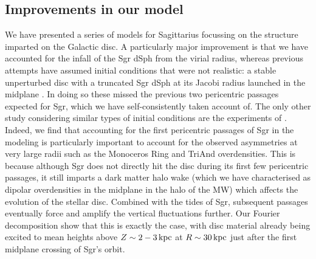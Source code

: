 \documentclass[useAMS,usenatbib]{mnras}
\begin{document}
{\subsection{Improvements in our model}
We have presented a series of models for Sagittarius focussing on the structure imparted on the Galactic disc. A particularly major improvement is that we have accounted for the infall of the Sgr dSph from the virial radius, whereas previous attempts have assumed initial conditions that were not realistic: a stable unperturbed disc with a truncated Sgr dSph at its Jacobi radius launched in the midplane \citep{purcell11,gomez13,price-whelan15}. In doing so these missed the previous two pericentric passages expected for Sgr, which we have self-consistently taken account of. The only other study considering similar types of initial conditions are the experiments of \citep{dierickx17}. Indeed, we find that accounting for the first pericentric passages of Sgr in the modeling is particularly important to account for the observed asymmetries at very large radii such as the Monoceros Ring and TriAnd overdensities. This is because although Sgr does not directly hit the disc during its first few pericentric passages, it still imparts a dark matter halo wake (which we have characterised as dipolar overdensities in the midplane in the halo of the MW) which affects the evolution of the stellar disc. Combined with the tides of Sgr, subsequent passages eventually force and amplify the vertical fluctuations further. Our Fourier decomposition show that this is exactly the case, with disc material already being excited to mean heights above $Z\sim2-3 \,\rm{kpc}$ at $R\sim30\,\rm{kpc}$ just after the first midplane crossing of Sgr's orbit. 

}
\end{document}
